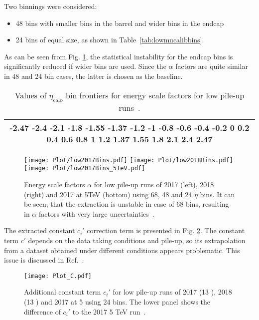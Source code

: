 Two binnings were considered:
\begin{itemize}
	\item 48 bins with smaller bins in the barrel and wider bins in the endcap
	\item 24 bins of equal size, as shown in Table~\ref{tab:lowmucalibbins}.
\end{itemize}
 As can be seen from Fig. \ref{fig:alpha-lowmu-manybinnings}, the
statistical instability for the endcap bins is significantly reduced if wider bins are used. 
Since the $\alpha$ factors are quite similar in 48 and 24 bin cases, the latter is chosen as the baseline.
\begin{table}
		\begin{tabular}{c}
			\toprule
			-2.47 -2.4 -2.1 -1.8 -1.55 -1.37 -1.2 -1 -0.8 -0.6 -0.4 -0.2 0 0.2 0.4 0.6 0.8 1 1.2 1.37 1.55 1.8 2.1 2.4 2.47\\
			\bottomrule
		\end{tabular}
	\caption{Values of $\eta_{\text{calo}}$ bin frontiers for energy scale factors for low pile-up runs~\cite{int_note_electrons}.}\label{tab:lowmucalibbins}
	\label{tab:CS_BinFrontier}
\end{table}


\begin{figure}[htp]
	\begin{center}
		\texttt{[image: Plot/low2017Bins.pdf]}%
		\texttt{[image: Plot/low2018Bins.pdf]}
		\texttt{[image: Plot/low2017Bins\_5TeV.pdf]}
		\caption{ Energy scale factors $\alpha$ for low pile-up runs of
			2017 (left), 2018 (right) and 2017 at 5TeV (bottom) using 68, 48 and 24 $\eta$ 
			bins. It can be seen, that the extraction is unstable in case of 68 bins,
			resulting in $\alpha$ factors with very large uncertainties~\cite{int_note_electrons}.}
		\label{fig:alpha-lowmu-manybinnings}
	\end{center}
\end{figure}

The extracted constant $c_i'$ correction term is presented in
Fig. \ref{fig:C_lowmu}. The constant term $c'$ depends on the data taking conditions and pile-up, so its extrapolation from a dataset obtained under different conditions appears problematic. This issue is discussed in Ref.~\cite{Andari:2651890}.

\begin{figure}[htp]
	\begin{center}
		\texttt{[image: Plot\_C.pdf]}%
		\caption{ Additional constant term $c_i'$ for low pile-up runs of 
			2017 (13 \TeV), 2018 (13 \TeV) and 2017 at 5 \TeV{} using 24 bins.
			The lower panel shows the difference of $c_i'$ to the 2017 5 TeV run~\cite{int_note_electrons}.}
		\label{fig:C_lowmu}
	\end{center}
\end{figure}


